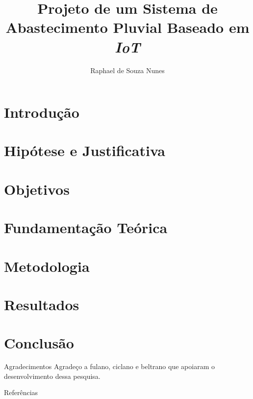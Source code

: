\documentclass[11pt]{beamer}
\title[Trabalho de Conclusão de Curso]{Projeto de um Sistema de Abastecimento Pluvial Baseado em \textit{IoT}}
\author[Nunes, de S. R.]{Raphael de Souza Nunes}
\begin{document}


\section{Introdução} 


\section{Hipótese e Justificativa}


\section{Objetivos}


\section{Fundamentação Teórica}


\section{Metodologia}


\section{Resultados}


\section{Conclusão}


\begin{frame}{Agradecimentos}
    \large{Agradeço a fulano, ciclano e beltrano que apoiaram o desenvolvimento dessa pesquisa.}
\end{frame}


\begin{frame}[allowframebreaks]{Referências}


\end{frame}


\begin{frame}
\titlepage 
\end{frame}
\end{document}
